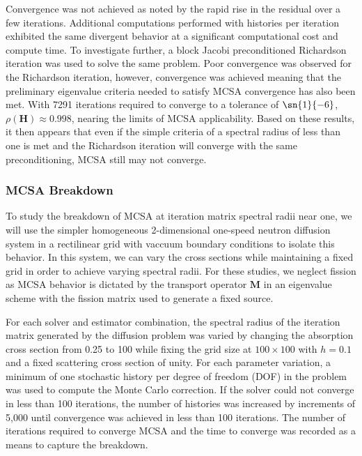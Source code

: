 \documentclass[letterpaper,11pt]{article}
\begin{document}
Convergence was not achieved as noted by the rapid rise in the
residual over a few iterations. Additional computations performed with
 histories per iteration exhibited the same divergent
behavior at a significant computational cost and compute time. To
investigate further, a block Jacobi preconditioned Richardson
iteration was used to solve the same problem. Poor convergence was
observed for the Richardson iteration, however, convergence was
achieved meaning that the preliminary eigenvalue criteria needed to
satisfy MCSA convergence has also been met. With 7291 iterations
required to converge to a tolerance of $\sn{1}{-6}$, $\rho(\mathbf{H})
\approx 0.998$, nearing the limits of MCSA applicability. Based on
these results, it then appears that even if the simple criteria of a
spectral radius of less than one is met and the Richardson iteration
will converge with the same preconditioning, MCSA still may not
converge.

\subsubsection{MCSA Breakdown}
\label{subsubsec:mcsa_break_down}
To study the breakdown of MCSA at iteration matrix spectral radii near
one, we will use the simpler homogeneous 2-dimensional one-speed
neutron diffusion system in a rectilinear grid with vaccuum boundary
conditions to isolate this behavior. In this system, we can vary the
cross sections while maintaining a fixed grid in order to achieve
varying spectral radii. For these studies, we neglect fission as MCSA
behavior is dictated by the transport operator $\mathbf{M}$ in an
eigenvalue scheme with the fission matrix used to generate a fixed
source.

For each solver and estimator combination, the spectral radius of the
iteration matrix generated by the diffusion problem was varied by
changing the absorption cross section from 0.25 to 100 while fixing
the grid size at $100 \times 100$ with $h = 0.1$ and a fixed
scattering cross section of unity. For each parameter variation, a
minimum of one stochastic history per degree of freedom (DOF) in the
problem was used to compute the Monte Carlo correction. If the solver
could not converge in less than 100 iterations, the number of
histories was increased by increments of 5,000 until convergence was
achieved in less than 100 iterations. The number of iterations
required to converge MCSA and the time to converge was recorded as a
means to capture the breakdown.
\end{document}
